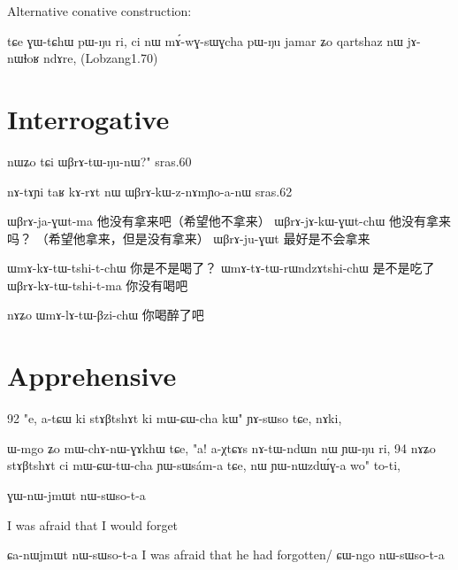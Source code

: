\documentclass[oldfontcommands,oneside,a4paper,11pt]{memoir}
\newcommand{\ipa}[1]{{\phon #1}} %
\newcommand{\wav}[1]{}%
\begin{document}
Alternative conative construction:

	tɕe ɣɯ-tɕhɯ pɯ-ŋu ri, ci nɯ mɤ́-wɣ-sɯɣcha pɯ-ŋu jamar ʑo qartshaz nɯ jɤ-nɯɬoʁ ndɤre,
(Lobzang1.70)




\section{Interrogative}

nɯʑo tɕi ɯβrɤ-tɯ-ŋu-nɯ?" sras.60

nɤ-tɤɲi taʁ kɤ-rɤt nɯ ɯβrɤ-kɯ-z-nɤmɲo-a-nɯ
sras.62

ɯβrɤ-ja-ɣɯt-ma 他没有拿来吧（希望他不拿来）
ɯβrɤ-jɤ-kɯ-ɣɯt-chɯ 他没有拿来吗？ （希望他拿来，但是没有拿来）
ɯβrɤ-ju-ɣɯt 最好是不会拿来

ɯmɤ-kɤ-tɯ-tshi-t-chɯ 你是不是喝了？
ɯmɤ-tɤ-tɯ-rɯndzɤtshi-chɯ 是不是吃了
ɯβrɤ-kɤ-tɯ-tshi-t-ma 你没有喝吧

nɤʑo ɯmɤ-lɤ-tɯ-βzi-chɯ 你喝醉了吧

\section{Apprehensive}
92 "e, a-tɕɯ ki stɤβtshɤt ki mɯ-ɕɯ-cha kɯ" ɲɤ-sɯso tɕe, nɤki,

ɯ-mgo ʑo mɯ-chɤ-nɯ-ɣɤkhɯ tɕe, "a! a-χtɕɤs nɤ-tɯ-ndɯn nɯ ɲɯ-ŋu ri,
94 nɤʑo stɤβtshɤt ci mɯ-ɕɯ-tɯ-cha ɲɯ-sɯsám-a tɕe, nɯ ɲɯ-nɯzdɯ́ɣ-a wo" to-ti,


ɣɯ-nɯ-jmɯt nɯ-sɯso-t-a

I was afraid that I would forget

ɕa-nɯjmɯt nɯ-sɯso-t-a
I was afraid that he had forgotten/
ɕɯ-ngo nɯ-sɯso-t-a
\end{document}
